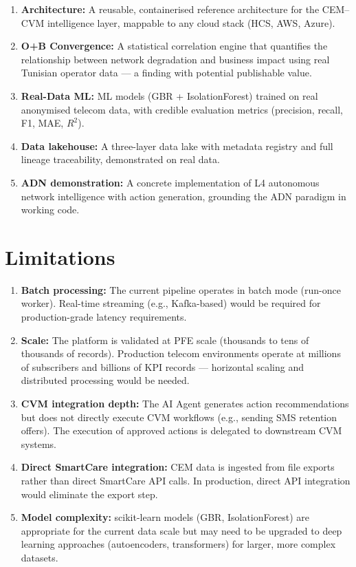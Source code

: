 \begin{enumerate}
  \item \textbf{Architecture:} A reusable, containerised reference architecture for the CEM--CVM intelligence layer, mappable to any cloud stack (HCS, AWS, Azure).
  
  \item \textbf{O+B Convergence:} A statistical correlation engine that quantifies the relationship between network degradation and business impact using real Tunisian operator data --- a finding with potential publishable value.
  
  \item \textbf{Real-Data ML:} ML models (GBR + IsolationForest) trained on real anonymised telecom data, with credible evaluation metrics (precision, recall, F1, MAE, $R^2$).
  
  \item \textbf{Data lakehouse:} A three-layer data lake with metadata registry and full lineage traceability, demonstrated on real data.
  
  \item \textbf{ADN demonstration:} A concrete implementation of L4 autonomous network intelligence with action generation, grounding the ADN paradigm in working code.
\end{enumerate}

\section{Limitations}

\begin{enumerate}
  \item \textbf{Batch processing:} The current pipeline operates in batch mode (run-once worker). Real-time streaming (e.g., Kafka-based) would be required for production-grade latency requirements.
  
  \item \textbf{Scale:} The platform is validated at PFE scale (thousands to tens of thousands of records). Production telecom environments operate at millions of subscribers and billions of KPI records --- horizontal scaling and distributed processing would be needed.
  
  \item \textbf{CVM integration depth:} The AI Agent generates action recommendations but does not directly execute CVM workflows (e.g., sending SMS retention offers). The execution of approved actions is delegated to downstream CVM systems.
  
  \item \textbf{Direct SmartCare integration:} CEM data is ingested from file exports rather than direct SmartCare API calls. In production, direct API integration would eliminate the export step.
  
  \item \textbf{Model complexity:} scikit-learn models (GBR, IsolationForest) are appropriate for the current data scale but may need to be upgraded to deep learning approaches (autoencoders, transformers) for larger, more complex datasets.
\end{enumerate}

